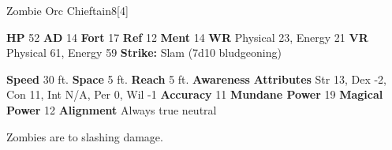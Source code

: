   \begin{monsubsection}{Zombie Orc Chieftain}{8}[4]
    \vspace{-1em}\vspace{-1em}
    \vspace{0em}

    
    

    \begin{spellcontent}
      \begin{spelltargetinginfo}
        \pari \textbf{HP} 52 \monsep
          \textbf{AD} 14 \monsep
          \textbf{Fort} 17 \monsep
          \textbf{Ref} 12 \monsep
          \textbf{Ment} 14
        \pari \textbf{WR} Physical 23, Energy 21 \monsep
        \textbf{VR} Physical 61, Energy 59
        \pari \textbf{Strike:}
            Slam  (7d10 bludgeoning)
      \end{spelltargetinginfo}
    \end{spellcontent}
    \begin{monsterfooter}
      \pari \textbf{Speed} 30 ft. \monsep
        \textbf{Space} 5 ft. \monsep
        \textbf{Reach} 5 ft.
      \pari \textbf{Awareness} 
      \pari \textbf{Attributes}
        Str 13, Dex -2,
        Con 11, Int N/A,
        Per 0, Wil -1
      \pari \textbf{Accuracy} 11 \monsep
        \textbf{Mundane Power} 19 \monsep
      \textbf{Magical Power} 12
      \pari \textbf{Alignment} Always true neutral
    \end{monsterfooter}
  \end{monsubsection}
          Zombies are  to slashing damage.
  
  